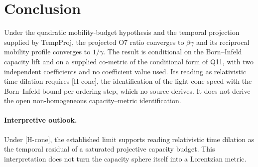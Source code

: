 \documentclass[11pt]{article}
\begin{document}
  \section{Conclusion}
  \label{sec:conclusion}

  Under the quadratic mobility-budget hypothesis and the temporal projection supplied by
  TempProj, the projected O7 ratio converges to $\beta\gamma$ and its reciprocal mobility
  profile converges to $1/\gamma$.
  The result is conditional on the Born--Infeld capacity lift and on a supplied co-metric of the conditional form of
  Q11, with two independent coefficients and no coefficient value used.
  Its reading as relativistic time dilation requires [H-cone], the identification of the light-cone speed with the
  Born--Infeld bound per ordering step, which no source derives.
  It does not derive the open non-homogeneous capacity--metric identification.

  \paragraph{Interpretive outlook.}
  Under [H-cone], the established limit supports reading relativistic time dilation as the temporal residual of
  a saturated projective capacity budget.
  This interpretation does not turn the capacity sphere itself into a Lorentzian metric.

  
  
\end{document}
